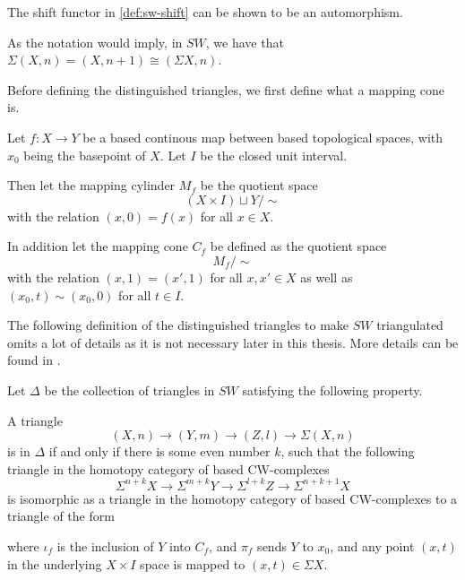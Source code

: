 The shift functor in \autoref{def:sw-shift} can be shown to be an automorphism.

As the notation would imply, in \( SW \), we have that \( \Sigma(X, n) = (X, n + 1) \cong ( \Sigma X, n ) \).

Before defining the distinguished triangles, we first define what a mapping cone is.
\begin{definition}
    Let \( f: X \to Y \) be a based continous map between based topological spaces, with \( x_0 \) being the basepoint of \( X \). Let \( I \) be the closed unit interval.

    Then let the mapping cylinder \( M_f \) be the quotient space
    \[
        (X \times I) \sqcup Y / \sim
    \]
    with the relation \( (x, 0) = f(x) \) for all \( x \in X \).

    In addition let the mapping cone \( C_f \) be defined as the quotient space
    \[
        M_f / \sim
    \]
    with the relation \( (x, 1) = (x', 1) \) for all \( x, x' \in X \) as well as \( (x_0, t) \sim (x_0, 0) \) for all \( t \in I \).
\end{definition}

The following definition of the distinguished triangles to make \( SW \) triangulated omits a lot of details as it is not necessary later in this thesis. More details can be found in \cite[Definition 5.8, Definition 4.7]{Daria_Bachelor}.

\begin{definition}
    \label{def:sw-dist_triangles}
    Let \( \Delta \) be the collection of triangles in \( SW \) satisfying the following property.

    A triangle
    \[
        (X, n) \to (Y, m) \to (Z, l) \to \Sigma (X, n)
    \]
    is in \( \Delta \) if and only if there is some even number \( k \), such that the following triangle in the homotopy category of based CW-complexes
    \[
        \Sigma^{n + k} X \to \Sigma^{m + k} Y \to \Sigma^{l + k} Z \to \Sigma^{n + k + 1} X
    \]
    is isomorphic as a triangle in the homotopy category of based CW-complexes to a triangle of the form
    \begin{center}
    \end{center}
    where \( \iota_f \) is the inclusion of \( Y \) into \( C_f \), and \( \pi_f \) sends \( Y \) to \( x_0 \), and any point \( (x, t) \) in the underlying \( X \times I \) space is mapped to \( (x, t) \in \Sigma X \).
\end{definition}

